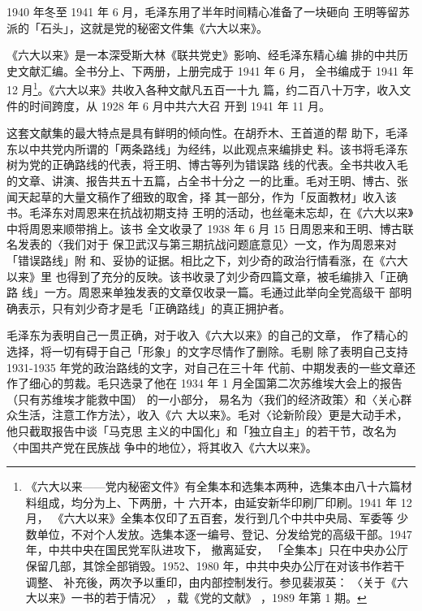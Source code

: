 1940 年冬至 1941 年 6 月，毛泽东用了半年时间精心准备了一块砸向
王明等留苏派的「石头」，这就是党的秘密文件集《六大以来》。

《六大以来》是一本深受斯大林《联共党史》影响、经毛泽东精心编
排的中共历史文献汇编。全书分上、下两册，上册完成于 1941 年 6 月，
全书编成于 1941 年 12 月\footnote{《六大以来——党内秘密文件》有全集本和选集本两种，选集本由八十六篇材料组成，均分为上、下两册，十
六开本，由延安新华印刷厂印刷。1941 年 12 月，
《六大以来》全集本仅印了五百套，发行到几个中共中央局、军委等
少数单位，不对个人发放。选集本逐一编号、登记、分发给党的高级干部。1947 年，中共中央在国民党军队进攻下，
撤离延安，
「全集本」只在中央办公厅保留几部，其馀全部销毁。1952、1980 年，中共中央办公厅在对该书作若干调整、
补充後，两次予以重印，由内部控制发行。参见裴淑英：
〈关于《六大以来》一书的若于情况〉
，载《党的文献》
，1989
年第 1 期。}。《六大以来》共收入各种文献凡五百一十九
篇，约二百八十万字，收入文件的时间跨度，从 1928 年 6 月中共六大召
开到 1941 年 11 月。

这套文献集的最大特点是具有鲜明的倾向性。在胡乔木、王首道的帮
助下，毛泽东以中共党内所谓的「两条路线」为经纬，以此观点来编排史
料。该书将毛泽东树为党的正确路线的代表，将王明、博古等列为错误路
线的代表。全书共收入毛的文章、讲演、报告共五十五篇，占全书十分之
一的比重。毛对王明、博古、张闻天起草的大量文稿作了细致的取舍，择
其一部分，作为「反面教材」收入该书。毛泽东对周恩来在抗战初期支持
王明的活动，也丝毫未忘却，在《六大以来》中将周恩来顺带捎上。该书
全文收录了 1938 年 6 月 15 日周恩来和王明、博古联名发表的〈我们对于
保卫武汉与第三期抗战问题底意见〉一文，作为周恩来对「错误路线」附
和、妥协的证据。相比之下，刘少奇的政治行情看涨，在《六大以来》里
也得到了充分的反映。该书收录了刘少奇四篇文章，被毛编排入「正确路
线」一方。周恩来单独发表的文章仅收录一篇。毛通过此举向全党高级干
部明确表示，只有刘少奇才是毛「正确路线」的真正拥护者。

毛泽东为表明自己一贯正确，对于收入《六大以来》的自己的文章，
作了精心的选择，将一切有碍于自己「形象」的文字尽情作了删除。毛剔
除了表明自己支持 1931-1935 年党的政治路线的文字，对自己在三十年
代前、中期发表的一些文章还作了细心的剪裁。毛只选录了他在 1934 年 1
月全国第二次苏维埃大会上的报告
（只有苏维埃才能救中国）
的一小部分，
易名为〈我们的经济政策〉和〈关心群众生活，注意工作方法〉，收入《六
大以来》。毛对〈论新阶段〉更是大动手术，他只截取报告中谈「马克思
主义的中国化」和「独立自主」的若干节，改名为〈中国共产党在民族战
争中的地位〉，将其收入《六大以来》。


